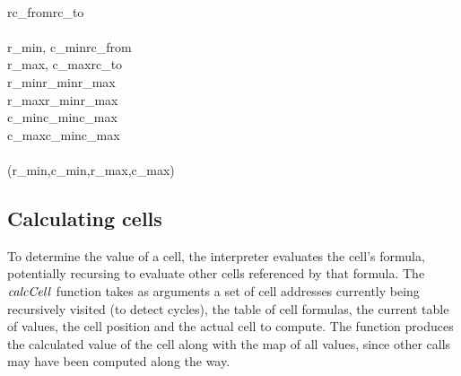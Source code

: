 \begin{hscode}
\\
\>[B]{}\;\;rc_{from}\;rc_{to}\mathrel{=}{}\<[E]%
\\
\>[B]{}\<[4]%
\>[4]{}\<[E]%
\\
\>[4]{}\<[7]%
\>[7]{}\llparenthesis \langle r_{min}\rangle , \langle c_{min}\rangle \rrparenthesis {}\<[41]%
\>[41]{}\mathrel{=}\;\;rc_{from}{}\<[E]%
\\
\>[4]{}\<[7]%
\>[7]{}\llparenthesis \langle r_{max}\rangle , {}\<[26]%
\>[26]{}\langle c_{max}\rangle \rrparenthesis {}\<[41]%
\>[41]{}\mathrel{=}\;\;rc_{to}{}\<[E]%
\\
\>[4]{}\<[7]%
\>[7]{}r_{min}{}\<[13]%
\>[13]{}\mathrel{=}\;{}\<[20]%
\>[20]{}r_{min}\;{}\<[27]%
\>[27]{}r_{max}{}\<[E]%
\\
\>[4]{}\<[7]%
\>[7]{}r_{max}{}\<[13]%
\>[13]{}\mathrel{=}\;{}\<[20]%
\>[20]{}r_{min}\;{}\<[27]%
\>[27]{}r_{max}{}\<[E]%
\\
\>[4]{}\<[7]%
\>[7]{}c_{min}{}\<[13]%
\>[13]{}\mathrel{=}\;{}\<[20]%
\>[20]{}c_{min}\;{}\<[27]%
\>[27]{}c_{max}{}\<[E]%
\\
\>[4]{}\<[7]%
\>[7]{}c_{max}{}\<[13]%
\>[13]{}\mathrel{=}\;{}\<[20]%
\>[20]{}c_{min}\;{}\<[27]%
\>[27]{}c_{max}{}\<[E]%
\\
\>[B]{}\<[4]%
\>[4]{}\<[E]%
\\
\>[4]{}\<[7]%
\>[7]{}(r_{min},c_{min},r_{max},c_{max}){}\<[E]%
\ColumnHook
\end{hscode}\resethooks

\subsection{Calculating cells}
\label{calccell}

To determine the value of a cell, the interpreter evaluates the cell's
formula, potentially recursing to evaluate other cells referenced by that
formula. The \ensuremath{\Varid{calcCell}} function takes as arguments a set of cell addresses
currently being recursively visited (to detect cycles), the table of cell
formulas, the current table of values, the cell position and the actual cell
to compute. The function produces the calculated value of the cell along with
the map of all values, since other calls may have been computed along the
way. 

